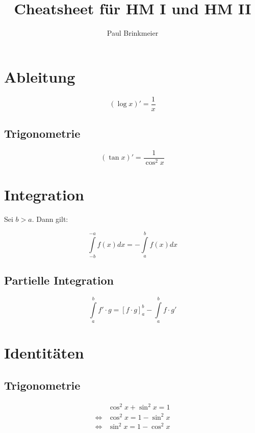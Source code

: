 \documentclass[a4paper, 16pt]{article}
\author{Paul Brinkmeier}
\title{Cheatsheet für HM I und HM II}
\begin{document}
	\maketitle
	\newpage
	\tableofcontents
	\newpage

	\section{Ableitung}

	\begin{equation*}
		(\log{x})' = \frac{1}{x}
	\end{equation*}

	\subsection{Trigonometrie}

	\begin{equation*}
		(\tan{x})' = \frac{1}{\cos^2{x}}
	\end{equation*}

	\section{Integration}

	Sei $b > a$. Dann gilt:

	\begin{equation*}
		\int\limits_{-b}^{-a}{f(x)dx} = -\int\limits_{a}^{b}{f(x)dx}
	\end{equation*}

	\subsection{Partielle Integration}

	\begin{equation*}
		\int\limits_{a}^{b}{f' \cdot g} = \left[f \cdot g\right]_{a}^{b} - \int\limits_{a}^{b}{f \cdot g'}
	\end{equation*}

	\section{Identitäten}

	\subsection{Trigonometrie}

	\begin{eqnarray*}
		&\cos^2 x + \sin^2 x = 1 \\
		\Leftrightarrow &\cos^2 x = 1 - \sin^2 x \\
		\Leftrightarrow &\sin^2 x = 1 - \cos^2 x
	\end{eqnarray*}
\end{document}
